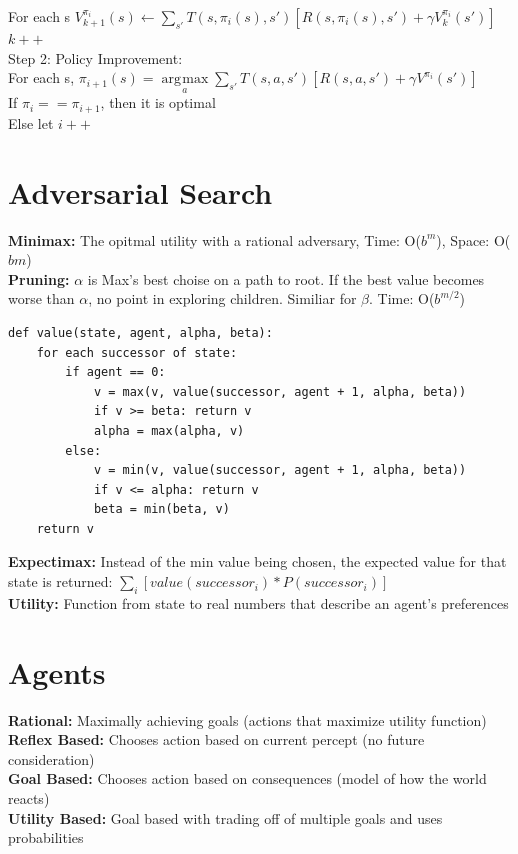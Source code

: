 \documentclass[10pt, a4paper]{article}
\DeclareMathOperator*{\argmax}{\arg\!\max}
\begin{document}
\begin{multicols*}{1}
            \hspace*{20 mm}For each s $V_{k + 1}^{\pi_i}(s) \gets \sum_{s'} T(s, \pi_i(s), s') [R(s, \pi_i(s), s') + \gamma V_k^{\pi_i}(s')]$\\
            \hspace*{15 mm}$k++$\\
            \hspace*{10 mm}Step 2: Policy Improvement:\\
            \hspace*{15 mm}For each s, $\pi_{i + 1}(s) = \argmax\limits_{a} \sum_{s'} T(s, a, s') [R(s, a, s') + \gamma V^{\pi_i}(s')]$\\
            \hspace*{15 mm}If $\pi_i == \pi_{i + 1}$, then it is optimal\\
            \hspace*{15 mm}Else let $i++$
        \section*{Adversarial Search}
            \textbf{Minimax:} The opitmal utility with a rational adversary, Time: O($b^m$), Space: O($bm$)\\
            \textbf{Pruning:} $\alpha$ is Max's best choise on a path to root. If the best value becomes worse than $\alpha$, no point in exploring children. Similiar for $\beta$. Time: O($b^{m / 2}$)
            \begin{verbatim}
def value(state, agent, alpha, beta):
    for each successor of state:
        if agent == 0:
            v = max(v, value(successor, agent + 1, alpha, beta))
            if v >= beta: return v
            alpha = max(alpha, v)
        else:
            v = min(v, value(successor, agent + 1, alpha, beta))
            if v <= alpha: return v
            beta = min(beta, v)
    return v
            \end{verbatim}
            \textbf{Expectimax:} Instead of the min value being chosen, the expected value for that state is returned: $\sum_{i} [value(successor_{i}) * P(successor_{i})]$\\
            \textbf{Utility:} Function from state to real numbers that describe an agent's preferences
        \section*{Agents}
            \textbf{Rational:} Maximally achieving goals (actions that maximize utility function) \\
            \textbf{Reflex Based:} Chooses action based on current percept (no future consideration)\\
            \textbf{Goal Based:} Chooses action based on consequences (model of how the world reacts)\\
            \textbf{Utility Based:} Goal based with trading off of multiple goals and uses probabilities

\end{multicols*}
\end{document}

